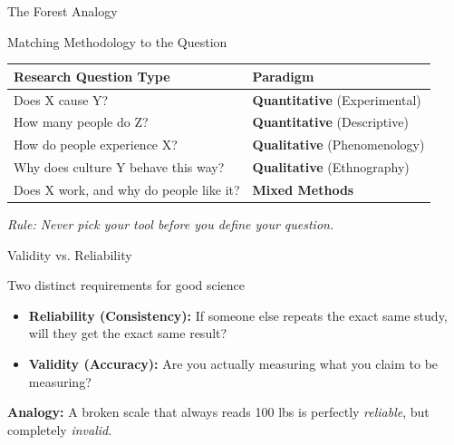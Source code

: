 \documentclass[aspectratio=169]{beamer}
\begin{document}
\begin{frame}{The Forest Analogy}
  \begin{center}
  \end{center}
\end{frame}

\begin{frame}{Matching Methodology to the Question}
  \begin{table}[]
    \begin{tabular}{|l|l|}
    \hline
    \textbf{Research Question Type} & \textbf{Paradigm} \\ \hline
    Does X cause Y? & \textbf{Quantitative} (Experimental) \\ \hline
    How many people do Z? & \textbf{Quantitative} (Descriptive) \\ \hline
    How do people experience X? & \textbf{Qualitative} (Phenomenology) \\ \hline
    Why does culture Y behave this way? & \textbf{Qualitative} (Ethnography) \\ \hline
    Does X work, and why do people like it? & \textbf{Mixed Methods} \\ \hline
    \end{tabular}
  \end{table}
  \vspace{0.3cm}
  \textit{Rule: Never pick your tool before you define your question.}
\end{frame}

\begin{frame}{Validity vs. Reliability}
  \begin{block}{Two distinct requirements for good science}
    \begin{itemize}
      \item \textbf{Reliability (Consistency):} If someone else repeats the exact same study, will they get the exact same result?
      \item \textbf{Validity (Accuracy):} Are you actually measuring what you claim to be measuring?
    \end{itemize}
  \end{block}
  \vspace{0.3cm}
  \textbf{Analogy:} A broken scale that always reads 100 lbs is perfectly \textit{reliable}, but completely \textit{invalid}.
\end{frame}
\end{document}
